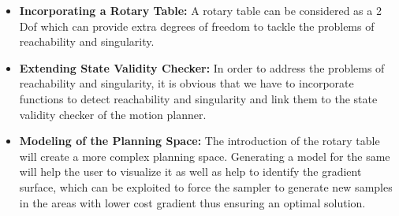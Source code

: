 \begin{itemize}
\item \textbf{Incorporating a Rotary Table:} A rotary table can be considered as a 2 Dof which can provide extra degrees of freedom to tackle the problems of reachability and singularity. 
\item \textbf{Extending State Validity Checker:} In order to address the problems of reachability and singularity, it is obvious that we have to incorporate functions to detect reachability and singularity and link them to the state validity checker of the motion planner.
\item \textbf{Modeling of the Planning Space:} The introduction of the rotary table will create a more complex planning space. Generating a model for the same will help the user to visualize it as well as help to identify the gradient surface, which can be exploited to force the sampler to generate new samples in the areas with lower cost gradient thus ensuring an optimal solution.
\end{itemize}